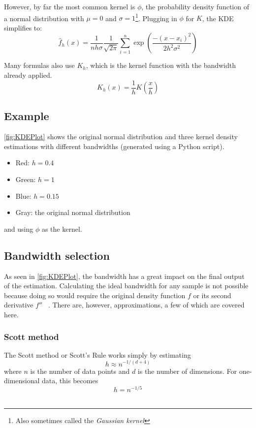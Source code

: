 However, by far the most common kernel is $\phi$, the probability density function of a normal distribution with $\mu=0$ and $\sigma=1$\footnote{Also sometimes called the \emph{Gaussian kernel}}. Plugging in $\phi$ for $K$, the KDE simplifies to:
\[
\hat{f}_{h}(x)=\frac{1}{nh\sigma} \frac{1}{\sqrt{ 2\pi }}\sum_{i=1}^n \exp\left( \frac{-{(x-x_{i})}^{2}}{2h^{2}\sigma^{2}} \right)
\]

Many formulas also use $K_h$, which is the kernel function with the bandwidth already applied.
\[
K_h(x)=\frac{1}{h}K\left(\frac{x}{h}\right)
\]


\subsection{Example}


\autoref{fig:KDEPlot} shows the original normal distribution and three kernel density estimations with different bandwidths (generated using a Python script).
\begin{itemize}
    \item Red: $h=0.4$
    \item Green: $h=1$
    \item Blue: $h=0.15$
    \item Gray: the original normal distribution
\end{itemize}
and using $\phi$ as the kernel.

\subsection{Bandwidth selection}

As seen in \autoref{fig:KDEPlot}, the bandwidth has a great impact on the final output of the estimation. Calculating the ideal bandwidth for any sample is not possible because doing so would require the original density function $f$ or its second derivative $f''$ \ \cite{kde:book}. There are, however, approximations, a few of which are covered here.

\subsubsection{Scott method}
The Scott method or Scott's Rule works simply by estimating
\[
h \approx n^{-1/(d+4)}
\]
where $n$ is the number of data points and $d$ is the number of dimensions. For one-dimensional data, this becomes
\[
h = n^{-1/5}
\]
\ \cite{kde:03}

